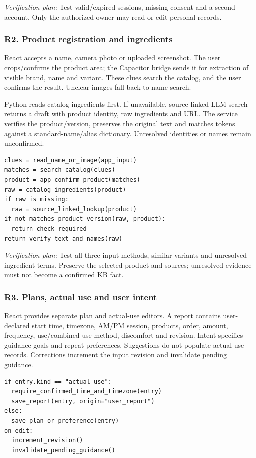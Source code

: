 \documentclass[conference,letterpaper]{IEEEtran}
\begin{document}
\textit{Verification plan:} Test valid/expired sessions, missing consent and a second account. Only the authorized owner may read or edit personal records.

\subsubsection*{R2. Product registration and ingredients}

React accepts a name, camera photo or uploaded screenshot. The user crops/confirms the product area; the Capacitor bridge sends it for extraction of visible brand, name and variant. These clues search the catalog, and the user confirms the result. Unclear images fall back to name search.

Python reads catalog ingredients first. If unavailable, source-linked LLM search returns a draft with product identity, raw ingredients and URL. The service verifies the product/version, preserves the original text and matches tokens against a standard-name/alias dictionary. Unresolved identities or names remain unconfirmed.

\begin{lstlisting}
clues = read_name_or_image(app_input)
matches = search_catalog(clues)
product = app_confirm_product(matches)
raw = catalog_ingredients(product)
if raw is missing:
  raw = source_linked_lookup(product)
if not matches_product_version(raw, product):
  return check_required
return verify_text_and_names(raw)
\end{lstlisting}



\textit{Verification plan:} Test all three input methods, similar variants and unresolved ingredient terms. Preserve the selected product and sources; unresolved evidence must not become a confirmed KB fact.

\subsubsection*{R3. Plans, actual use and user intent}

React provides separate plan and actual-use editors. A report contains user-declared start time, timezone, AM/PM session, products, order, amount, frequency, use/combined-use method, discomfort and revision. Intent specifies guidance goals and repeat preferences. Suggestions do not populate actual-use records. Corrections increment the input revision and invalidate pending guidance.

\begin{lstlisting}
if entry.kind == "actual_use":
  require_confirmed_time_and_timezone(entry)
  save_report(entry, origin="user_report")
else:
  save_plan_or_preference(entry)
on_edit:
  increment_revision()
  invalidate_pending_guidance()
\end{lstlisting}
\end{document}
